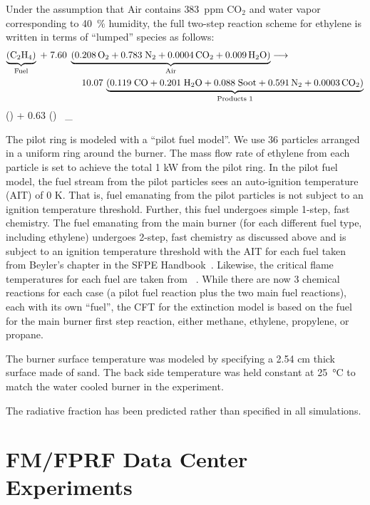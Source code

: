 Under the assumption that Air contains 383~ppm CO$_2$ and water vapor corresponding to 40~\% humidity, the full two-step reaction scheme for ethylene is written in terms of ``lumped'' species as follows:
\begin{eqnarray}
\lefteqn{ \underbrace{\mathrm{ (C_2H_4) }}_\text{Fuel} \; + \;
7.60 \; \underbrace{ \mathrm{\left( 0.208 \, O_2 + 0.783 \; N_2 + 0.0004 \, CO_2 + 0.009 \, H_2O \right)}}_\text{Air} \longrightarrow } \quad \quad \quad \quad \quad \quad \quad \nonumber \\
& & 10.07 \, \underbrace{\mathrm{(0.119 \; CO +  0.201 \; H_2O + 0.088 \; Soot +  0.591\, N_2 + 0.0003 \, CO_2)}}_\text{Products 1}
\end{eqnarray}
\be
() + 0.63 \; ()  \, _
\ee

The pilot ring is modeled with a ``pilot fuel model''.  We use 36 particles arranged in a uniform ring around the burner.  The mass flow rate of ethylene from each particle is set to achieve the total 1 kW from the pilot ring.  In the pilot fuel model, the fuel stream from the pilot particles sees an auto-ignition temperature (AIT) of 0 K.  That is, fuel emanating from the pilot particles is not subject to an ignition temperature threshold.  Further, this fuel undergoes simple 1-step, fast chemistry.  The fuel emanating from the main burner (for each different fuel type, including ethylene) undergoes 2-step, fast chemistry as discussed above and is subject to an ignition temperature threshold with the AIT for each fuel taken from Beyler's chapter in the SFPE Handbook~\cite{SFPE:Beyler}.  Likewise, the critical flame temperatures for each fuel are taken from ~\cite{SFPE:Beyler}.  While there are now 3 chemical reactions for each case (a pilot fuel reaction plus the two main fuel reactions), each with its own ``fuel'', the CFT for the extinction model is based on the fuel for the main burner first step reaction, either methane, ethylene, propylene, or propane.

The burner surface temperature was modeled by specifying a 2.54 cm thick surface made of sand.  The back side temperature was held constant at \SI{25}{\degreeCelsius} to match the water cooled burner in the experiment.

The radiative fraction has been predicted rather than specified in all simulations.

\section{FM/FPRF Data Center Experiments}
\label{FM_FPRF_Datacenter_Description}


